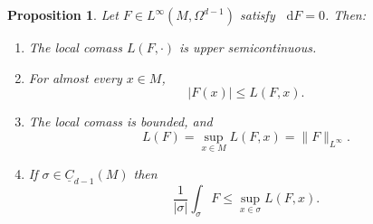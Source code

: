 \documentclass[reqno,11pt]{amsart}
\newcommand*\dif{\mathop{}\!\mathrm{d}}
\newcommand{\Chain}{\underline C}
\newtheorem{proposition}[theorem]{Proposition}
\theoremstyle{definition}
\numberwithin{equation}{section}
\begin{document}
\begin{proposition}\label{crandall}
Let $F \in L^\infty(M, \Omega^{d - 1})$ satisfy $\dif F = 0$. Then:
\begin{enumerate}
\item The local comass $L(F, \cdot)$ is upper semicontinuous. \label{crandall usc}
\item For almost every $x \in M$,
$$|F(x)| \leq L(F, x).$$
\label{crandall LDT}
\item The local comass is bounded, and \label{crandall linfinity}
$$L(F) = \sup_{x \in M} L(F, x) = \|F\|_{L^\infty}.$$
\item If $\sigma \in \Chain_{d - 1}(M)$ then \label{crandall best curl is ABC}
$$\frac{1}{|\sigma|} \int_\sigma F \leq \sup_{x \in \sigma} L(F, x).$$
\end{enumerate}
\end{proposition}
\end{document}
